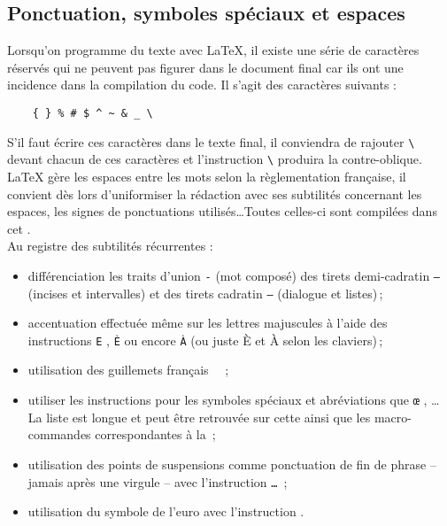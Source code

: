 \documentclass[a4paper, 11pt, twoside, fleqn]{memoir}
\begin{document}
	\subsection{Ponctuation, symboles spéciaux et espaces\label{subsec:ponctuation_symboles_speciaux_espaces}}
	
	Lorsqu'on programme du texte avec \LaTeX{}, il existe une série de caractères réservés qui ne peuvent pas figurer dans le document final car ils ont une incidence dans la compilation du code. Il s'agit des caractères suivants :
	\begin{verbatim}
	{ } % # $ ^ ~ & _ \
	\end{verbatim}		
S'il faut écrire ces caractères dans le texte final, il conviendra de rajouter \texttt{\textbackslash} devant chacun de ces caractères et l'instruction \texttt{\textbackslash} produira la contre-oblique.\\

	\LaTeX{} gère les espaces entre les mots selon la règlementation française, il convient dès lors d'uniformiser la rédaction avec ses subtilités concernant les espaces, les signes de ponctuations utilisés\ldots Toutes celles-ci sont compilées dans cet .\\
	
	Au registre des subtilités récurrentes :
	\begin{itemize}
	\item différenciation les traits d'union \texttt{-} (mot composé) des tirets demi-cadratin \texttt{--} (incises et intervalles) et des tirets cadratin \texttt{---} (dialogue et listes)\,;
	\item accentuation effectuée même sur les lettres majuscules à l'aide des instructions \texttt{\’E} , \texttt{\`E} ou encore \texttt{\`A} (ou juste È et À selon les claviers)\,;
	\item utilisation des guillemets français  \texttt{\og <mot entre guillemets> \fg{}} \,;
	\item utiliser les instructions pour les symboles spéciaux et abréviations que \texttt{\oe{}} , \texttt{\ier{}}\ldots{} La liste est longue et peut être retrouvée sur cette  ainsi que les macro-commandes correspondantes à la  \,;
	\item utilisation des points de suspensions comme ponctuation de fin de phrase -- jamais après une virgule -- avec l'instruction \texttt{\ldots} \,;
	\item utilisation du symbole de l'euro \EUR{} avec l'instruction \texttt{\EUR{}} .
	\end{itemize}
	
\end{document}

